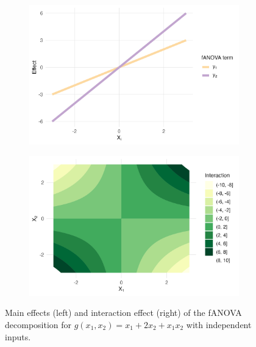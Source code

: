 \begin{figure}[htpb]
    \centering
    \begin{subfigure}[t]{0.49\textwidth}
        \centering
        \includegraphics[width=\textwidth]{images/experiment_section/running_example_a1p10_a2p20_a11p00_a22p00_a12p10_rhop00_main.png}
    \end{subfigure}%
    \hfill
    \begin{subfigure}[t]{0.49\textwidth}
        \centering
        \includegraphics[width=\textwidth]{images/experiment_section/running_example_a1p10_a2p20_a11p00_a22p00_a12p10_rhop00_interaction.png}
    \end{subfigure}
    \caption{Main effects (left) and interaction effect (right) of the fANOVA decomposition for $g(x_1, x_2) = x_1 + 2 x_2 + x_1 x_2$ with independent inputs.}
    \label{fig:running_ex_independent}
\end{figure}

